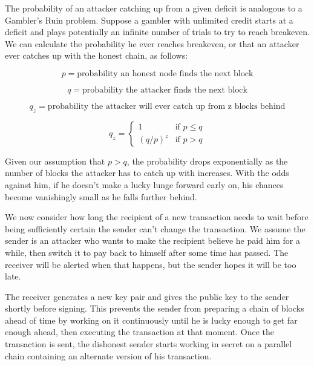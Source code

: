 \documentclass{article}
\begin{document}
{The probability of an attacker catching up from a given deficit is analogous to a Gambler's Ruin problem. Suppose a gambler with unlimited credit starts at a deficit and plays potentially an infinite number of trials to try to reach breakeven. We can calculate the probability he ever reaches breakeven, or that an attacker ever catches up with the honest chain, as follows:

\begin{equation}
p = \text{probability an honest node finds the next block}
\end{equation}

\begin{equation}
q = \text{probability the attacker finds the next block}
\end{equation}

\begin{equation}
q_z = \text{probability the attacker will ever catch up from z blocks behind}
\end{equation}

\begin{equation}
q_z = \begin{cases}
1 & \text{if } p \leq q \\
(q/p)^z & \text{if } p > q
\end{cases}

\end{equation}

Given our assumption that $p > q$, the probability drops exponentially as the number of blocks the attacker has to catch up with increases. With the odds against him, if he doesn't make a lucky lunge forward early on, his chances become vanishingly small as he falls further behind.

We now consider how long the recipient of a new transaction needs to wait before being sufficiently certain the sender can't change the transaction. We assume the sender is an attacker who wants to make the recipient believe he paid him for a while, then switch it to pay back to himself after some time has passed. The receiver will be alerted when that happens, but the sender hopes it will be too late.

The receiver generates a new key pair and gives the public key to the sender shortly before signing. This prevents the sender from preparing a chain of blocks ahead of time by working on it continuously until he is lucky enough to get far enough ahead, then executing the transaction at that moment. Once the transaction is sent, the dishonest sender starts working in secret on a parallel chain containing an alternate version of his transaction.

}
\end{document}
